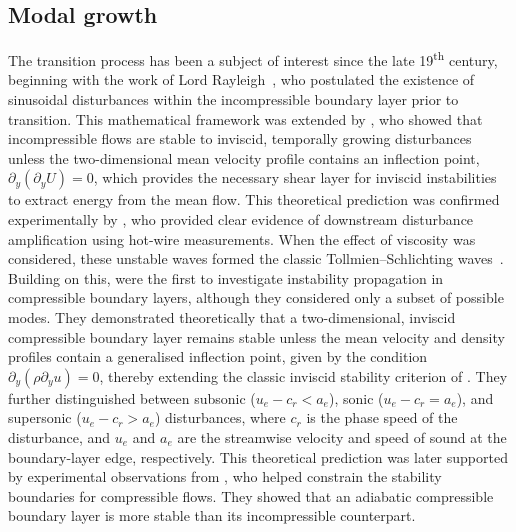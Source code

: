 \subsection{Modal growth}
The transition process has been a subject of interest since the late 19\textsuperscript{th} century, beginning with the work of Lord Rayleigh~\citep{Rayleigh1878,Rayleigh1880}, who postulated the existence of sinusoidal disturbances within the incompressible boundary layer prior to transition. This mathematical framework was extended by \citet{Tollmien1936}, who showed that incompressible flows are stable to inviscid, temporally growing disturbances unless the two-dimensional mean velocity profile contains an inflection point, $\partial_y (\partial_y U) = 0$, which provides the necessary shear layer for inviscid instabilities to extract energy from the mean flow. This theoretical prediction was confirmed experimentally by \citet{Schubauer1948}, who provided clear evidence of downstream disturbance amplification using hot-wire measurements. When the effect of viscosity was considered, these unstable waves formed the classic Tollmien--Schlichting waves~\citep{Schlichting2000}. Building on this, \citet{LeesLin1946} were the first to investigate instability propagation in compressible boundary layers, although they considered only a subset of possible modes. They demonstrated theoretically that a two-dimensional, inviscid compressible boundary layer remains stable unless the mean velocity and density profiles contain a generalised inflection point, given by the condition $\partial_y ( \rho \partial_y u) = 0$, thereby extending the classic inviscid stability criterion of \citet{Tollmien1936}. They further distinguished between subsonic ($u_e - c_r < a_e$), sonic ($u_e - c_r = a_e$), and supersonic ($u_e - c_r > a_e$) disturbances, where $c_r$ is the phase speed of the disturbance, and $u_e$ and $a_e$ are the streamwise velocity and speed of sound at the boundary-layer edge, respectively. This theoretical prediction was later supported by experimental observations from \citet{Laufer1960}, who helped constrain the stability boundaries for compressible flows. They showed that an adiabatic compressible boundary layer is more stable than its incompressible counterpart.

